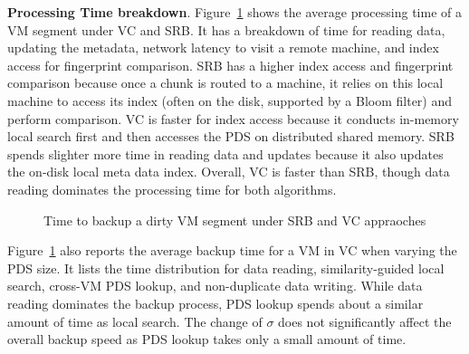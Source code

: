 {\bf Processing Time breakdown}.
Figure~\ref{fig:vc_srb_combined} shows
the  average  processing  time of  a VM segment under VC and SRB. 
It has a breakdown of time for reading data, updating the metadata, network latency to visit
a remote machine, and index access for fingerprint comparison.
SRB has a higher index access and fingerprint comparison because once a chunk is routed to a machine,
it relies on this local machine to access its index (often on the disk, supported by a Bloom filter) 
and perform comparison.
VC is faster for index access because it conducts in-memory local search first and then
accesses  the PDS on distributed shared memory.  
SRB spends  slighter more time in  reading data and updates because it also updates the on-disk
local meta data index.
Overall,  VC is faster than SRB, though data reading dominates the processing time for both algorithms.

\begin{figure}[htbp]
  \centering
  \caption{Time to backup a dirty VM segment under SRB and VC appraoches}
  \label{fig:vc_srb_combined}
\end{figure}


Figure~\ref{fig:vc_srb_combined} also reports the average backup time for a VM in VC when
varying the PDS size.  It lists the time distribution for data reading,
similarity-guided local search, cross-VM PDS lookup, and non-duplicate data writing. 
While data reading dominates the backup process, PDS lookup spends about a similar amount
of time as local search.
The change of $\sigma$ does not significantly affect the overall backup speed as
PDS lookup takes only a small amount of time.



